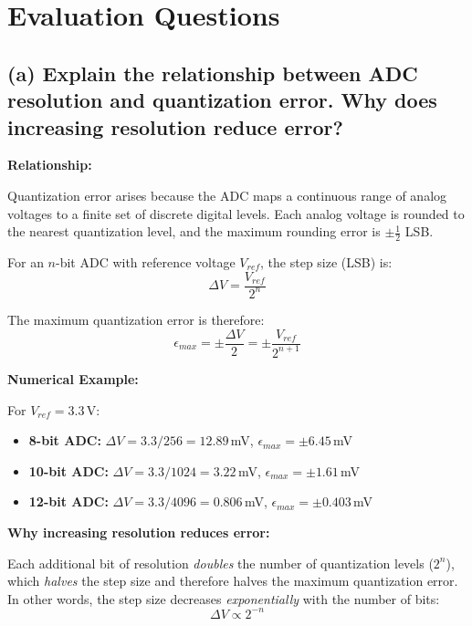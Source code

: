 \documentclass[12pt,a4paper]{article}
\begin{document}
\section{Evaluation Questions}

\subsection*{(a) Explain the relationship between ADC resolution and quantization error. Why does increasing resolution reduce error?}

\textbf{Relationship:}

Quantization error arises because the ADC maps a continuous range of analog voltages to a finite set of discrete digital levels. Each analog voltage is rounded to the nearest quantization level, and the maximum rounding error is $\pm \frac{1}{2}$ LSB.

For an $n$-bit ADC with reference voltage $V_{ref}$, the step size (LSB) is:
\begin{equation}
    \Delta V = \frac{V_{ref}}{2^n}
\end{equation}

The maximum quantization error is therefore:
\begin{equation}
    \epsilon_{max} = \pm \frac{\Delta V}{2} = \pm \frac{V_{ref}}{2^{n+1}}
\end{equation}

\textbf{Numerical Example:}

For $V_{ref} = 3.3$\,V:
\begin{itemize}
    \item \textbf{8-bit ADC:} $\Delta V = 3.3 / 256 = 12.89$\,mV, $\epsilon_{max} = \pm 6.45$\,mV
    \item \textbf{10-bit ADC:} $\Delta V = 3.3 / 1024 = 3.22$\,mV, $\epsilon_{max} = \pm 1.61$\,mV
    \item \textbf{12-bit ADC:} $\Delta V = 3.3 / 4096 = 0.806$\,mV, $\epsilon_{max} = \pm 0.403$\,mV
\end{itemize}

\textbf{Why increasing resolution reduces error:}

Each additional bit of resolution \emph{doubles} the number of quantization levels ($2^n$), which \emph{halves} the step size and therefore halves the maximum quantization error. In other words, the step size decreases \emph{exponentially} with the number of bits:
\begin{equation}
    \Delta V \propto 2^{-n}
\end{equation}
\end{document}
